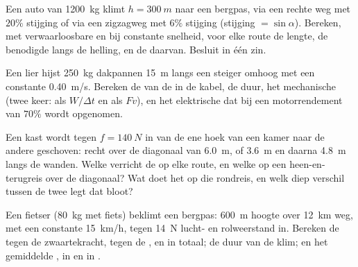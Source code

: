 \begin{exercise}[$\star\star\star$]\label{exo:g11:work-of-force:12}
Een auto van \qty{1200}{kg} klimt $h = \qty{300}{m}$ naar een bergpas,
via een rechte weg met $20\%$ stijging of via een zigzagweg met $6\%$
stijging (stijging $= \sin\alpha$). Bereken, met verwaarloosbare 
en bij constante snelheid, voor elke route de lengte, de benodigde 
langs de helling, en de  daarvan. Besluit in één zin.
\end{exercise}

\begin{exercise}[$\star\star\star$]\label{exo:g11:work-of-force:13}
Een lier hijst \qty{250}{kg} dakpannen \qty{15}{m} langs een steiger
omhoog met een constante \qty{0.40}{m/s}. Bereken de  van de 
in de kabel, de duur, het mechanische  (twee keer: als
$W/\Delta t$ en als $Fv$), en het elektrische  dat bij een
motorrendement van $70\%$ wordt opgenomen.
\end{exercise}

\begin{exercise}[$\star\star\star$]\label{exo:g11:work-of-force:14}
Een kast wordt tegen $f = \qty{140}{N}$  in van de ene hoek van
een kamer naar de andere geschoven: recht over de diagonaal van
\qty{6.0}{m}, of \qty{3.6}{m} en daarna \qty{4.8}{m} langs de wanden.
Welke  verricht de  op elke route, en welke op een
heen-en-terugreis over de diagonaal? Wat doet het  op die
rondreis, en welk diep verschil tussen de twee  legt dat bloot?
\end{exercise}

\begin{exercise}[$\star\star\star$]\label{exo:g11:work-of-force:15}
Een fietser (\qty{80}{kg} met fiets) beklimt een bergpas: \qty{600}{m}
hoogte over \qty{12}{km} weg, met een constante \qty{15}{km/h}, tegen
\qty{14}{N} lucht- en rolweerstand in. Bereken de  tegen de
zwaartekracht, tegen de , en in totaal; de duur van de klim; en
het gemiddelde , in  en in .
\end{exercise}


